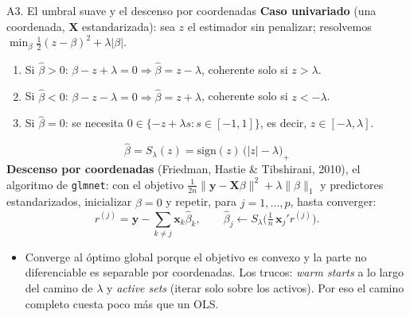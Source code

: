 \documentclass{beamer}
\newcommand{\1}{\mathbb{I}}
\newcommand{\sign}{\mathrm{sign}}
\begin{document}
\begin{frame}{A3. El umbral suave y el descenso por coordenadas}
\small
\textbf{Caso univariado} (una coordenada, $\mathbf{X}$ estandarizada): sea $z$ el estimador sin penalizar; resolvemos $\min_\beta \tfrac{1}{2}(z - \beta)^2 + \lambda|\beta|$.
\begin{enumerate}\itemsep2pt
  \item Si $\hat{\beta} > 0$: $\beta - z + \lambda = 0 \Rightarrow \hat{\beta} = z - \lambda$, coherente solo si $z > \lambda$.
  \item Si $\hat{\beta} < 0$: $\beta - z - \lambda = 0 \Rightarrow \hat{\beta} = z + \lambda$, coherente solo si $z < -\lambda$.
  \item Si $\hat{\beta} = 0$: se necesita $0 \in \{-z + \lambda s : s \in [-1,1]\}$, es decir, $z \in [-\lambda, \lambda]$.
\end{enumerate}
\[ \boxed{\; \hat{\beta} = S_{\lambda}(z) = \sign(z)\,\big(|z| - \lambda\big)_{+} \;} \]
\pause
\textbf{Descenso por coordenadas} (Friedman, Hastie \& Tibshirani, 2010), el algoritmo de \texttt{glmnet}: con el objetivo $\tfrac{1}{2n}\|\mathbf{y}-\mathbf{X}\beta\|^2 + \lambda\|\beta\|_1$ y predictores estandarizados, inicializar $\hat{\beta} = 0$ y repetir, para $j = 1, \ldots, p$, hasta converger:
\[ r^{(j)} = \mathbf{y} - \sum_{k \neq j} \mathbf{x}_k \hat{\beta}_k, \qquad \hat{\beta}_j \leftarrow S_{\lambda}\!\Big( \tfrac{1}{n}\, \mathbf{x}_j' r^{(j)} \Big). \]
\pause
\begin{itemize}\itemsep2pt
  \item Converge al óptimo global porque el objetivo es convexo y la parte no diferenciable es separable por coordenadas. Los trucos: \emph{warm starts} a lo largo del camino de $\lambda$ y \emph{active sets} (iterar solo sobre los activos). Por eso el camino completo cuesta poco más que un OLS.
\end{itemize}
\end{frame}
\end{document}
